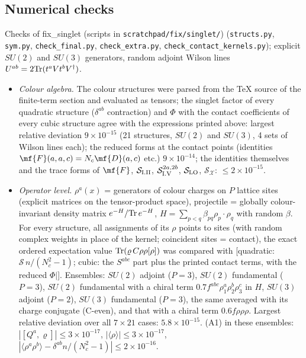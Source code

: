 {\subsection{Numerical checks}\label{sec:s-checks}
\sloppy\noindent Checks of fix\_singlet (scripts in \texttt{scratchpad/fix/singlet/}) (\texttt{structs.py}, \texttt{sym.py}, \texttt{check\_final.py}, \texttt{check\_extra.py}, \texttt{check\_contact\_kernels.py}); explicit $SU(2)$ and $SU(3)$ generators, random adjoint Wilson lines $U^{ab}=2{\rm Tr}(t^{a}Vt^{b}V^{\dagger})$.
\begin{itemize}
\item \emph{Colour algebra.} The colour structures were parsed from the TeX source of the finite-term section and evaluated as tensors; the singlet factor of every quadratic structure ($\delta^{ab}$ contraction) and $\Phi$ with the contact coefficients of every cubic structure agree with the expressions printed above: largest relative deviation $9\times10^{-15}$ (21 structures, $SU(2)$ and $SU(3)$, 4 sets of Wilson lines each); the reduced forms at the contact points (identities $\mf{F}(a,a,c)=N_{c}\mf{D}(a,c)$ etc.) $9\times10^{-14}$; the identities themselves and the trace forms of $\mf{F}$, $\mathcal{S}_{\rm I.II}$, $\mathcal{S}^{2a,2b}_{\rm I.V}$, $\mathcal{S}_{\rm LO}$, $\mathcal{S}_{\mathcal{X}}$: $\le2\times10^{-15}$.
\item \emph{Operator level.} $\rho^{a}(x)$ = generators of colour charges on $P$ lattice sites (explicit matrices on the tensor-product space), projectile = globally colour-invariant density matrix $e^{-H}/{\rm Tr}\,e^{-H}$, $H=\sum_{p<q}\beta_{pq}\rho_{p}\cdot\rho_{q}$ with random $\beta$. For every structure, all assignments of its $\rho$ points to sites (with random complex weights in place of the kernel; coincident sites = contact), the exact ordered expectation value ${\rm Tr}(\varrho\,C\rho\rho[\rho])$ was compared with [quadratic: $\mathcal{S}\,n/(N_{c}^{2}-1)$; cubic: the $S^{abc}$ part plus the printed contact terms, with the reduced $\Phi|$]. Ensembles: $SU(2)$ adjoint ($P=3$), $SU(2)$ fundamental ($P=3$), $SU(2)$ fundamental with a chiral term $0.7f^{abc}\rho^{a}_{1}\rho^{b}_{2}\rho^{c}_{3}$ in $H$, $SU(3)$ adjoint ($P=2$), $SU(3)$ fundamental ($P=3$), the same averaged with its charge conjugate (C-even), and that with a chiral term $0.6f\rho\rho\rho$. Largest relative deviation over all $7\times21$ cases: $5.8\times10^{-15}$. (A1) in these ensembles: $|[Q^{a},\varrho]|\le3\times10^{-17}$, $|\langle\rho\rangle|\le3\times10^{-17}$, $|\langle\rho^{a}\rho^{b}\rangle-\delta^{ab}n/(N_{c}^{2}-1)|\le2\times10^{-16}$.

\end{itemize}}
